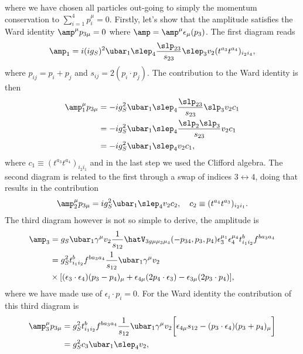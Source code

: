 where we have chosen all particles out-going to simply the momentum conservation to $\sum_{i=1}^4p_i^\mu = 0$. Firstly, let's show that the amplitude satisfies the Ward identity $\amp^\mu p_{3\mu} = 0$ where $\amp = \amp^\mu \epsilon_\mu(p_3)$. The first diagram reads
\begin{equation}
    \amp_1 = i(ig_S)^2\ubar_1\slep_4\frac{\slp_{23}}{s_{23}}\slep_3v_2(t^{a_3}t^{a_4})_{i_2i_4},
\end{equation}
where $p_{ij} = p_i + p_j$ and $s_{ij} = 2(p_i \cdot p_j)$. The contribution to the Ward identity is then
\begin{equation}
    \begin{split}
        \amp_1^\mu p_{3\mu} &= -ig_S^2\ubar_1\slep_4\frac{\slp_{23}}{s_{23}}\slp_3v_2c_1 \\
        &= -ig_S^2\ubar_1\slep_4\frac{\slp_2\slp_3}{s_{23}}v_2c_1 \\
        &= -ig_S^2\ubar_1\slep_4v_2c_1,
    \end{split}
\end{equation}
where $c_1 \equiv (t^{a_3}t^{a_4})_{i_2i_1}$ and in the last step we used the Clifford algebra. The second diagram is related to the first through a swap of indices $3 \leftrightarrow 4$, doing that results in the contribution
\begin{equation}
    \amp_2^\mu p_{3\mu} = ig_S^2\ubar_1\slep_4v_2c_2,\quad c_2 \equiv (t^{a_4}t^{a_3})_{i_2i_1}.
\end{equation}
The third diagram however is not so simple to derive, the amplitude is 
\begin{equation}
    \begin{split}
        \amp_3 &= g_S\ubar_1\gamma^\mu v_2\frac{1}{s_{12}}\hatV_{3g\mu\mu_3\mu_4}(-p_{34},p_3,p_4)\epsilon^{\mu_1}_3\epsilon^{\mu_4}_4 t^b_{i_1i_2}f^{ba_3a_4} \\
        &= g_S^2t^b_{i_1i_2}f^{ba_3a_4}\frac{1}{s_{12}}\ubar_1\gamma^\mu v_2 \\
        &\times[(\epsilon_3\cdot\epsilon_4)(p_3 - p_4)_\mu + \epsilon_{4\mu}(2p_4 \cdot \epsilon_3) - \epsilon_{3\mu}(2p_3 \cdot p_4)],
    \end{split}
\end{equation}
where we have made use of $\epsilon_i\cdot p_i = 0$. For the Ward identity the contribution of this third diagram is
\begin{equation}
    \begin{split}
        \amp_3^\mu p_{3\mu} &= g_S^2t^b_{i_1i_2}f^{ba_3a_4}\frac{1}{s_{12}}\ubar_1\gamma^\mu v_2\bigg[\epsilon_{4\mu}s_{12} - (p_3\cdot \epsilon_4)(p_3 + p_4)_\mu\bigg] \\
        &= g_S^2c_3\ubar_1\slep_4v_2,
    \end{split}
\end{equation}
